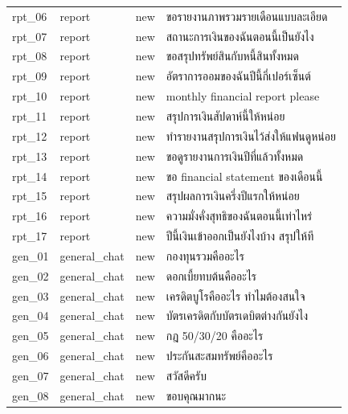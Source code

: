 \documentclass[11pt,a4paper]{article}
\begin{document}
{\begin{longtable}{lllp{9.5cm}}
rpt\_\allowbreak{}06 & report & new & {\thaifont ขอรายงานภาพรวมรายเดือนแบบละเอียด} \\
rpt\_\allowbreak{}07 & report & new & {\thaifont สถานะการเงินของฉันตอนนี้เป็นยังไง} \\
rpt\_\allowbreak{}08 & report & new & {\thaifont ขอสรุปทรัพย์สินกับหนี้สินทั้งหมด} \\
rpt\_\allowbreak{}09 & report & new & {\thaifont อัตราการออมของฉันปีนี้กี่เปอร์เซ็นต์} \\
rpt\_\allowbreak{}10 & report & new & monthly financial report please \\
rpt\_\allowbreak{}11 & report & new & {\thaifont สรุปการเงินสัปดาห์นี้ให้หน่อย} \\
rpt\_\allowbreak{}12 & report & new & {\thaifont ทำรายงานสรุปการเงินไว้ส่งให้แฟนดูหน่อย} \\
rpt\_\allowbreak{}13 & report & new & {\thaifont ขอดูรายงานการเงินปีที่แล้วทั้งหมด} \\
rpt\_\allowbreak{}14 & report & new & {\thaifont ขอ }financial statement {\thaifont ของเดือนนี้} \\
rpt\_\allowbreak{}15 & report & new & {\thaifont สรุปผลการเงินครึ่งปีแรกให้หน่อย} \\
rpt\_\allowbreak{}16 & report & new & {\thaifont ความมั่งคั่งสุทธิของฉันตอนนี้เท่าไหร่} \\
rpt\_\allowbreak{}17 & report & new & {\thaifont ปีนี้เงินเข้าออกเป็นยังไงบ้าง สรุปให้ที} \\
gen\_\allowbreak{}01 & general\_\allowbreak{}chat & new & {\thaifont กองทุนรวมคืออะไร} \\
gen\_\allowbreak{}02 & general\_\allowbreak{}chat & new & {\thaifont ดอกเบี้ยทบต้นคืออะไร} \\
gen\_\allowbreak{}03 & general\_\allowbreak{}chat & new & {\thaifont เครดิตบูโรคืออะไร ทำไมต้องสนใจ} \\
gen\_\allowbreak{}04 & general\_\allowbreak{}chat & new & {\thaifont บัตรเครดิตกับบัตรเดบิตต่างกันยังไง} \\
gen\_\allowbreak{}05 & general\_\allowbreak{}chat & new & {\thaifont กฎ }50/30/20 {\thaifont คืออะไร} \\
gen\_\allowbreak{}06 & general\_\allowbreak{}chat & new & {\thaifont ประกันสะสมทรัพย์คืออะไร} \\
gen\_\allowbreak{}07 & general\_\allowbreak{}chat & new & {\thaifont สวัสดีครับ} \\
gen\_\allowbreak{}08 & general\_\allowbreak{}chat & new & {\thaifont ขอบคุณมากนะ} \\

\end{longtable}}
\end{document}

